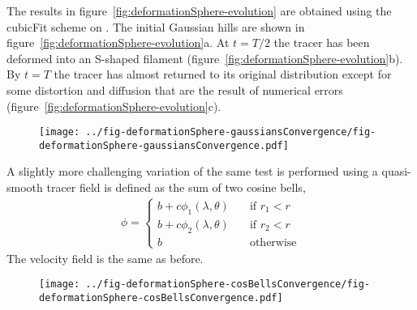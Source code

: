 The results in figure~\ref{fig:deformationSphere-evolution} are obtained using the cubicFit scheme on .  The initial Gaussian hills are shown in figure~\ref{fig:deformationSphere-evolution}a.  At $t=T/2$ the tracer has been deformed into an S-shaped filament (figure~\ref{fig:deformationSphere-evolution}b).  By $t=T$ the tracer has almost returned to its original distribution except for some distortion and diffusion that are the result of numerical errors (figure~\ref{fig:deformationSphere-evolution}c).

\begin{figure}
	\centering
	\texttt{[image: ../fig-deformationSphere-gaussiansConvergence/fig-deformationSphere-gaussiansConvergence.pdf]}
	\caption{}
\end{figure}



A slightly more challenging variation of the same test is performed using a quasi-smooth tracer field is defined as the sum of two cosine bells,
\begin{align}
	\phi =
	\begin{cases}
		b + c \phi_1(\lambda, \theta) & \quad \text{if $r_1 < r$} \\
		b + c \phi_2(\lambda, \theta) & \quad \text{if $r_2 < r$} \\
		b			      & \quad \text{otherwise}
	\end{cases}
\end{align}
The velocity field is the same as before.


\begin{figure}
	\centering
	\texttt{[image: ../fig-deformationSphere-cosBellsConvergence/fig-deformationSphere-cosBellsConvergence.pdf]}
	\caption{  }
\end{figure}

